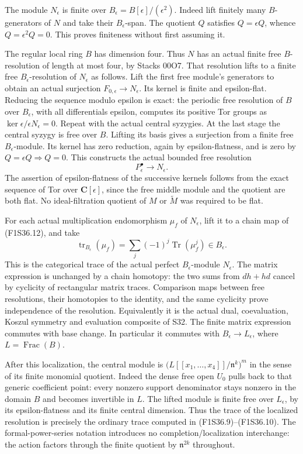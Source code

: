 The module $N_\epsilon$ is finite over
$B_\epsilon=B[\epsilon]/(\epsilon^2)$.
Indeed lift finitely many $B$-generators of
$N$ and take their $B_\epsilon$-span.
The quotient $Q$ satisfies $Q=\epsilon Q$,
whence $Q=\epsilon^2Q=0$.
This proves finiteness without first assuming it.

The regular local ring $B$ has dimension four.
Thus $N$ has an actual finite free $B$-resolution
of length at most four, by Stacks 00O7.
That resolution lifts to a finite free
$B_\epsilon$-resolution of $N_\epsilon$ as follows.
Lift the first free module's generators to obtain
an actual surjection $F_{0,\epsilon}\to N_\epsilon$.
Its kernel is finite and epsilon-flat.
Reducing the sequence modulo epsilon is exact:
the periodic free resolution of $B$ over
$B_\epsilon$, with all differentials epsilon,
computes its positive Tor groups as
$\ker\epsilon/\epsilon N_\epsilon=0$.
Repeat with the actual central syzygies.
At the last stage the central syzygy is free
over $B$. Lifting its basis gives a surjection
from a finite free $B_\epsilon$-module.
Its kernel has zero reduction, again by
epsilon-flatness, and is zero by
$Q=\epsilon Q\Rightarrow Q=0$.
This constructs the actual bounded free resolution
\[
      P_\epsilon^\bullet\longrightarrow N_\epsilon.
 \tag{F1S36.12}
\]
The assertion of epsilon-flatness of the
successive kernels follows from the exact
sequence of Tor over $\mathbf C[\epsilon]$,
since the free middle module and the quotient
are both flat. No ideal-filtration quotient of
$M$ or $\widetilde M$ was required to be flat.

For each actual multiplication endomorphism
$\mu_f$ of $N_\epsilon$, lift it to a chain map
of (F1S36.12), and take
\[
       \operatorname{tr}_{B_\epsilon}(\mu_f)
        =\sum_j(-1)^j\operatorname{Tr}(\mu_f^j)
                                      \in B_\epsilon.
 \tag{F1S36.13}
\]
This is the categorical trace of the actual
perfect $B_\epsilon$-module $N_\epsilon$.
The matrix expression is unchanged by a chain
homotopy: the two sums from $dh+hd$ cancel
by cyclicity of rectangular matrix traces.
Comparison maps between free resolutions,
their homotopies to the identity, and the same
cyclicity prove independence of the resolution.
Equivalently it is the actual dual, coevaluation,
Koszul symmetry and evaluation composite of S32.
The finite matrix expression commutes with
base change. In particular it commutes with
$B_\epsilon\to L_\epsilon$, where
$L=\operatorname{Frac}(B)$.

After this localization, the central module is
$\bigl(L[[x_1,\ldots,x_4]]/\mathfrak n^k\bigr)^m$
in the sense of its finite monomial quotient.
Indeed the dense free open $U_0$ pulls back
to that generic coefficient point: every
nonzero support denominator stays nonzero
in the domain $B$ and becomes invertible in $L$.
The lifted module is finite free over
$L_\epsilon$, by its epsilon-flatness and
its finite central dimension. Thus the trace
of the localized resolution is precisely the
ordinary trace computed in (F1S36.9)--(F1S36.10).
The formal-power-series notation introduces
no completion/localization interchange:
the action factors through the finite quotient
by $\mathfrak n^{2k}$ throughout.

